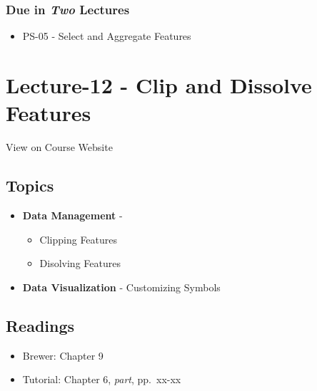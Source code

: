 \documentclass[]{book}
\providecommand{\tightlist}{%
  \setlength{\itemsep}{0pt}\setlength{\parskip}{0pt}}
\begin{document}
\hypertarget{due-in-two-lectures-4}{%
\subsubsection*{\texorpdfstring{Due in \emph{Two} Lectures}{Due in Two Lectures}}\label{due-in-two-lectures-4}}

\begin{itemize}
\tightlist
\item
  PS-05 - Select and Aggregate Features
\end{itemize}

\hypertarget{lecture-12---clip-and-dissolve-features}{%
\section*{Lecture-12 - Clip and Dissolve Features}\label{lecture-12---clip-and-dissolve-features}}

View on Course Website

\hypertarget{topics-12}{%
\subsection*{Topics}\label{topics-12}}

\begin{itemize}
\tightlist
\item
  \textbf{Data Management} -

  \begin{itemize}
  \tightlist
  \item
    Clipping Features
  \item
    Disolving Features
  \end{itemize}
\item
  \textbf{Data Visualization} - Customizing Symbols
\end{itemize}

\hypertarget{readings-12}{%
\subsection*{Readings}\label{readings-12}}

\begin{itemize}
\tightlist
\item
  Brewer: Chapter 9
\item
  Tutorial: Chapter 6, \emph{part}, pp.~xx-xx
\end{itemize}
\end{document}
